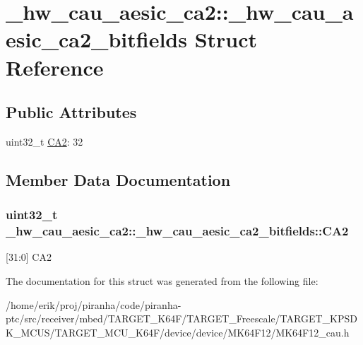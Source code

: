 \hypertarget{struct__hw__cau__aesic__ca2_1_1__hw__cau__aesic__ca2__bitfields}{}\section{\+\_\+hw\+\_\+cau\+\_\+aesic\+\_\+ca2\+:\+:\+\_\+hw\+\_\+cau\+\_\+aesic\+\_\+ca2\+\_\+bitfields Struct Reference}
\label{struct__hw__cau__aesic__ca2_1_1__hw__cau__aesic__ca2__bitfields}
\subsection*{Public Attributes}
\begin{DoxyCompactItemize}
\item 
uint32\+\_\+t \hyperlink{struct__hw__cau__aesic__ca2_1_1__hw__cau__aesic__ca2__bitfields_a11e36c50b7c1297112163ab511dcc51b}{C\+A2}\+: 32
\end{DoxyCompactItemize}


\subsection{Member Data Documentation}
\subsubsection[{\texorpdfstring{C\+A2}{CA2}}]{\setlength{\rightskip}{0pt plus 5cm}uint32\+\_\+t \+\_\+hw\+\_\+cau\+\_\+aesic\+\_\+ca2\+::\+\_\+hw\+\_\+cau\+\_\+aesic\+\_\+ca2\+\_\+bitfields\+::\+C\+A2}\hypertarget{struct__hw__cau__aesic__ca2_1_1__hw__cau__aesic__ca2__bitfields_a11e36c50b7c1297112163ab511dcc51b}{}\label{struct__hw__cau__aesic__ca2_1_1__hw__cau__aesic__ca2__bitfields_a11e36c50b7c1297112163ab511dcc51b}
\mbox{[}31\+:0\mbox{]} C\+A2 

The documentation for this struct was generated from the following file\+:\begin{DoxyCompactItemize}
\item 
/home/erik/proj/piranha/code/piranha-\/ptc/src/receiver/mbed/\+T\+A\+R\+G\+E\+T\+\_\+\+K64\+F/\+T\+A\+R\+G\+E\+T\+\_\+\+Freescale/\+T\+A\+R\+G\+E\+T\+\_\+\+K\+P\+S\+D\+K\+\_\+\+M\+C\+U\+S/\+T\+A\+R\+G\+E\+T\+\_\+\+M\+C\+U\+\_\+\+K64\+F/device/device/\+M\+K64\+F12/M\+K64\+F12\+\_\+cau.\+h\end{DoxyCompactItemize}
